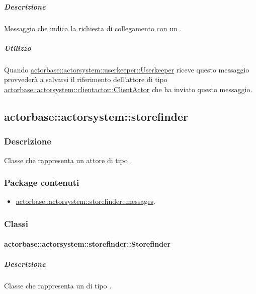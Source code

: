 \documentclass{scalatekids-article}
\begin{document}
\subparagraph{Descrizione}

Messaggio che indica la richiesta di collegamento con un .

\subparagraph{Utilizzo}

Quando \hyperref[sec:actorbase::actorsystem::userkeeper::Userkeeper]{actorbase::\allowbreak{}actorsystem::\allowbreak{}userkeeper::\allowbreak{}Userkeeper}
riceve questo messaggio provvederà a salvarsi il riferimento dell'attore di tipo
\hyperref[sec:actorbase::actorsystem::clientactor::ClientActor]{actorbase::\allowbreak{}actorsystem::\allowbreak{}clientactor::\allowbreak{}ClientActor}
che ha inviato questo messaggio.

\subsection{actorbase::actorsystem::storefinder}
\label{sec:actorbase::actorsystem::storefinder}

\subsubsection{Descrizione}

Classe che rappresenta un attore di tipo .

\subsubsection{Package contenuti}

\begin{itemize}

\item \hyperref[sec:actorbase::actorsystem::storefinder::messages]{actorbase::actorsystem::storefinder::messages}.

\end{itemize}

\subsubsection{Classi}

\paragraph{actorbase::actorsystem::storefinder::Storefinder}
\label{sec:actorbase::actorsystem::storefinder::Storefinder}

\subparagraph{Descrizione}

Classe che rappresenta un  di tipo .
\end{document}
